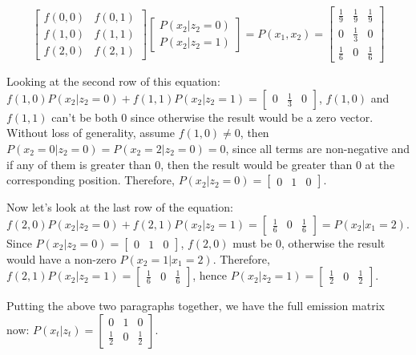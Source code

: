 \documentclass{article}
\begin{document}
$$
\begin{bmatrix} f(0, 0) & f(0, 1) \\ f(1, 0) & f(1, 1) \\ f(2, 0) & f(2, 1) \end{bmatrix}
\begin{bmatrix} P(x_2|z_2=0) \\ P(x_2|z_2=1) \end{bmatrix}
= P(x_1, x_2)
=  \begin{bmatrix}
    \frac{1}{9} & \frac{1}{9} & \frac{1}{9} \\
    0 & \frac{1}{3} & 0 \\
    \frac{1}{6} & 0 & \frac{1}{6}
\end{bmatrix}
$$

Looking at the second row of this equation: $f(1,0) P(x_2|z_2=0) + f(1,1)P(x_2|z_2=1)= \begin{bmatrix}0 & \frac{1}{3} & 0 \end{bmatrix}$, $f(1,0)$ and $f(1,1)$ can't be both 0 since otherwise the result would be a zero vector. Without loss of generality, assume $f(1,0)\ne 0$, then $P(x_2=0|z_2=0)=P(x_2=2|z_2=0)=0$, since all terms are non-negative and if any of them is greater than
0, then the result would be greater than 0 at the corresponding position. Therefore, $P(x_2|z_2=0)=\begin{bmatrix}0 & 1& 0 \end{bmatrix}$.

Now let's look at the last row of the equation: $f(2,0) P(x_2|z_2=0) + f(2,1)P(x_2|z_2=1)= \begin{bmatrix} \frac{1}{6} &0 &  \frac{1}{6} \end{bmatrix}=P(x_2|x_1=2)$. Since $P(x_2|z_2=0)=\begin{bmatrix}0 & 1& 0 \end{bmatrix}$, $f(2,0)$ must be 0, otherwise the result would have a non-zero $P(x_2=1|x_1=2)$. Therefore, $f(2,1)P(x_2|z_2=1)= \begin{bmatrix} \frac{1}{6} &0 &  \frac{1}{6} \end{bmatrix}$, hence $P(x_2|z_2=1)= \begin{bmatrix} \frac{1}{2} &0 &  \frac{1}{2} \end{bmatrix}$.

Putting the above two paragraphs together, we have the full emission matrix now: $P(x_t|z_t)=\begin{bmatrix}0 & 1& 0\\  \frac{1}{2} &0 &  \frac{1}{2}  \end{bmatrix}$.
\end{document}
